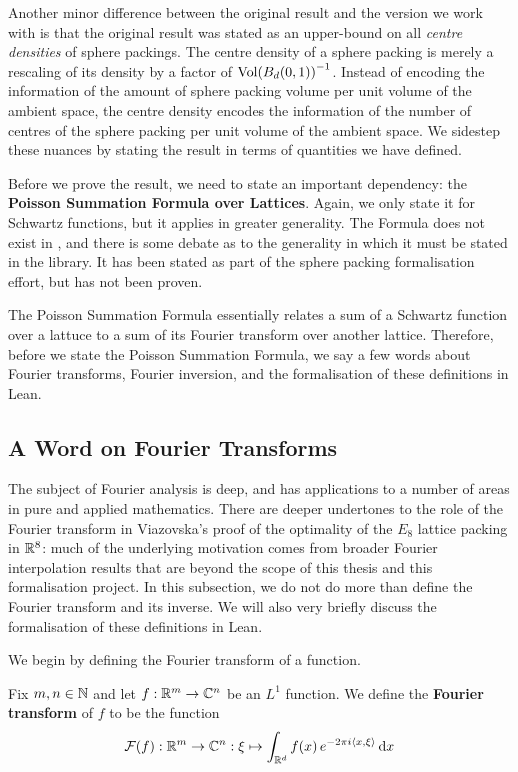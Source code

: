 Another minor difference between the original result and the version we work with is that the original result was stated as an upper-bound on all \textit{centre densities} of sphere packings. The centre density of a sphere packing is merely a rescaling of its density by a factor of $\operatorname{Vol}\!\left( B_d\!\left( 0, 1 \right) \right)^{-1}$. Instead of encoding the information of the amount of sphere packing volume per unit volume of the ambient space, the centre density encodes the information of the number of centres of the sphere packing per unit volume of the ambient space. We sidestep these nuances by stating the result in terms of quantities we have defined.

Before we prove the result, we need to state an important dependency: the \textbf{Poisson Summation Formula over Lattices}. Again, we only state it for Schwartz functions, but it applies in greater generality. The Formula does not exist in \mathlib, and there is some debate as to the generality in which it must be stated in the library. It has been stated as part of the sphere packing formalisation effort, but has not been proven.

The Poisson Summation Formula essentially relates a sum of a Schwartz function over a lattuce to a sum of its Fourier transform over another lattice. Therefore, before we state the Poisson Summation Formula, we say a few words about Fourier transforms, Fourier inversion, and the formalisation of these definitions in Lean.

\subsection{A Word on Fourier Transforms}

The subject of Fourier analysis is deep, and has applications to a number of areas in pure and applied mathematics. There are deeper undertones to the role of the Fourier transform in Viazovska's proof of the optimality of the $E_8$ lattice packing in $\mathbb{R}^8$: much of the underlying motivation comes from broader Fourier interpolation results that are beyond the scope of this thesis and this formalisation project. In this subsection, we do not do more than define the Fourier transform and its inverse. We will also very briefly discuss the formalisation of these definitions in Lean.

We begin by defining the Fourier transform of a function.

\begin{boxdefinition}
    Fix $m, n \in \mathbb{N}$ and let $f : \mathbb{R}^m \to \mathbb{C}^n$ be an $L^1$ function. We define the \textbf{Fourier transform} of $f$ to be the function
    \begin{align*}
        \mathcal{F}(f) : \mathbb{R}^m \to \mathbb{C}^n : \xi \mapsto \int_{\mathbb{R}^d} f\!\left( x \right) e^{-2 \pi i \left\langle x, \xi \right\rangle} \operatorname{d}\!x
    \end{align*}
\end{boxdefinition}

